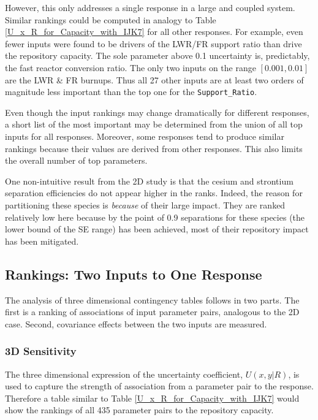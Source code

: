 However, this only addresses a single response in a large and coupled system.
Similar rankings could be computed in analogy to Table \ref{U_x_R_for_Capacity_with_IJK7} 
for all other responses.  For example, even fewer inputs were found to be drivers of the 
LWR/FR support ratio than drive the repository capacity.  The sole parameter above 
0.1 uncertainty is, predictably, the fast reactor conversion ratio.
The only two inputs on the range $[0.001, 0.01]$ are the LWR \& FR burnups.  
Thus all 27 other inputs are at least two orders of magnitude
less important than the top one for the \texttt{Support\_Ratio}.

Even though the input rankings may change dramatically for different responses, 
a short list of the most important may be determined from the union of all top
inputs for all responses.  Moreover, some responses tend to produce similar rankings 
because their values are derived from other responses.
This also limits the overall number of top parameters.

One non-intuitive result from the 2D study is that the cesium and strontium separation 
efficiencies do not appear higher in the ranks.  Indeed, the reason for
partitioning these species is \emph{because} of their large impact.  They are ranked 
relatively low here  because by the point of 0.9 separations for these species
(the lower bound of the SE range) has been achieved, most of their repository impact has been mitigated.

\subsection{Rankings: Two Inputs to One Response}
\label{cts_sec:rank3D}

The analysis of three dimensional contingency tables follows in two parts.  The first is 
a ranking of associations of input parameter pairs, analogous to
the 2D case.  Second, covariance effects between the two inputs are measured.

\subsubsection{3D Sensitivity}
\label{cts_sec:3D_sensitivity}

%

The three dimensional expression of the uncertainty coefficient, $U(x,y|R)$, is used to 
capture the strength of association from a parameter pair to the response.
Therefore a table similar to Table \ref{U_x_R_for_Capacity_with_IJK7} would show the 
rankings of all 435 parameter pairs
to the repository capacity.


